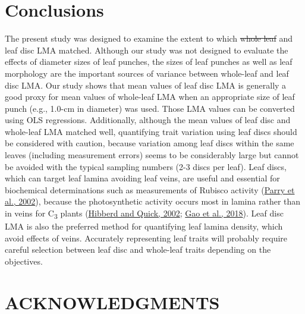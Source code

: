 \documentclass[
  12pt,
  a4paper,
,tablecaptionabove
]{scrartcl}
\providecommand{\DIFaddtex}[1]{{\protect\color{blue}\uwave{#1}}} %
\providecommand{\DIFdeltex}[1]{{\protect\color{red}\sout{#1}}}                      %
\providecommand{\DIFaddbegin}{} %
\providecommand{\DIFaddend}{} %
\providecommand{\DIFdelbegin}{} %
\providecommand{\DIFdelend}{} %
\providecommand{\DIFadd}[1]{\texorpdfstring{\DIFaddtex{#1}}{#1}} %
\providecommand{\DIFdel}[1]{\texorpdfstring{\DIFdeltex{#1}}{}} %
\begin{document}
\hypertarget{conclusions}{%
\section{Conclusions}\label{conclusions}}

The present study was designed to examine the extent to which \DIFdelbegin \DIFdel{whole leaf }\DIFdelend \DIFaddbegin \DIFadd{whole-leaf }\DIFaddend and leaf disc LMA matched.
Although our study was not designed to evaluate the effects of diameter sizes of leaf punches, the sizes of leaf punches as well as leaf morphology are the important sources of variance between whole-leaf and leaf disc LMA.
Our study shows that mean values of leaf disc LMA is generally a good proxy for mean values of whole-leaf LMA when an appropriate size of leaf punch (e.g., 1.0-cm in diameter) was used.
Those LMA values can be converted using OLS regressions.
Additionally, although the mean values of leaf disc and whole-leaf LMA matched well, quantifying trait variation using leaf discs should be considered with caution, because variation among leaf discs within the same leaves (including measurement errors) seems to be considerably large but cannot be avoided with the typical sampling numbers (2-3 discs per leaf).
Leaf discs, which can target leaf lamina avoiding leaf veins, are useful and essential for biochemical determinations such as measurements of Rubisco activity (\protect\hyperlink{ref-Parry2002}{Parry et al., 2002}), because the photosynthetic activity occurs most in lamina rather than in veins for C\textsubscript{3} plants (\protect\hyperlink{ref-Hibberd2002}{Hibberd and Quick, 2002}; \protect\hyperlink{ref-Gao2018}{Gao et al., 2018}).
Leaf disc LMA is also the preferred method for quantifying leaf lamina density, which avoid effects of veins.
Accurately representing leaf traits will probably require careful selection between leaf disc and whole-leaf traits depending on the objectives.

\hypertarget{acknowledgments}{%
\section{ACKNOWLEDGMENTS}\label{acknowledgments}}
\end{document}
